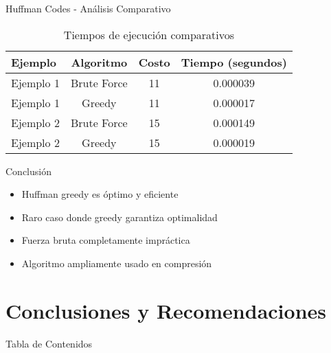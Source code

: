 \documentclass[aspectratio=169]{beamer}
\begin{document}
\begin{frame}{Huffman Codes - Análisis Comparativo}

\begin{table}
\centering
\small
\begin{tabular}{lccc}
\toprule
\textbf{Ejemplo} & \textbf{Algoritmo} & \textbf{Costo} & \textbf{Tiempo (segundos)} \\
\midrule
Ejemplo 1 & Brute Force & 11 & 0.000039 \\
Ejemplo 1 & Greedy & 11 & 0.000017 \\
Ejemplo 2 & Brute Force & 15 & 0.000149 \\
Ejemplo 2 & Greedy & 15 & 0.000019 \\
\bottomrule
\end{tabular}
\caption{Tiempos de ejecución comparativos}
\end{table}
    
    \begin{block}{Conclusión}
    \begin{itemize}
    \item Huffman greedy es óptimo y eficiente
    \item Raro caso donde greedy garantiza optimalidad
    \item Fuerza bruta completamente impráctica
    \item Algoritmo ampliamente usado en compresión
    \end{itemize}
    \end{block}
\end{frame}

\section{Conclusiones y Recomendaciones}

\begin{frame}{Tabla de Contenidos}
\end{frame}
\end{document}
